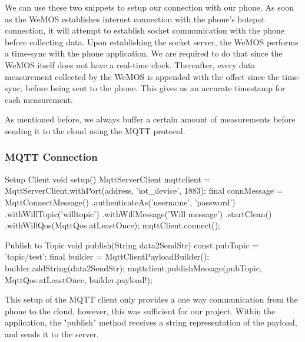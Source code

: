 \documentclass{article}
\begin{document}
\begin{multicols}{2}
We can use these two snippets to setup our connection with our phone. As soon as the WeMOS establishes internet connection with the phone's hotspot connection, it will attempt to establish socket communication with the phone before collecting data. Upon establishing the socket server, the WeMOS performs a time-sync with the phone application. We are required to do that since the WeMOS itself does not have a real-time clock. Thereafter, every data measurement collected by the WeMOS is appended with the offset since the time-sync, before being sent to the phone. This gives us an accurate timestamp for each measurement. 

As mentioned before, we always buffer a certain amount of measurements before sending it to the cloud using the MQTT protocol.
\end{multicols}

\subsubsection{MQTT Connection}
\begin{multicols}{2}

\begin{code}{Setup Client}
void setup(){
    MqttServerClient mqttclient = MqttServerClient.withPort(address, 'iot_device', 1883);
    final connMessage = MqttConnectMessage()
          .authenticateAs('username', 'password')
          .withWillTopic('willtopic')
          .withWillMessage('Will message')
          .startClean()
          .withWillQos(MqttQos.atLeastOnce);
    mqttClient.connect();
}
\end{code}

\begin{code}{Publish to Topic}
void publish(String data2SendStr) {
    const pubTopic = 'topic/test';
    final builder = MqttClientPayloadBuilder();
    builder.addString(data2SendStr);
    mqttclient.publishMessage(pubTopic, MqttQos.atLeastOnce, builder.payload!);
}
\end{code}

This setup of the MQTT client only provides a one way communication from the phone to the cloud, however, this was sufficient for our project. Within the application, the "publish" method receives a string representation of the payload, and sends it to the server.
\end{multicols}

\newpage
\end{document}
